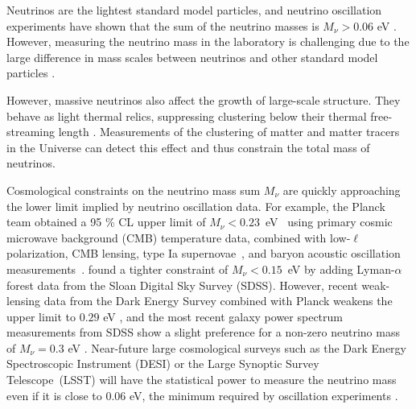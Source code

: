 \documentclass[useAMS, usenatbib]{mnras}
\begin{document}
Neutrinos are the lightest standard model particles, and neutrino oscillation experiments have shown that the sum of the neutrino masses is $M_\nu > 0.06$ eV \citep{Becker-Szendy_1992, Fukuda_1998}.
However, measuring the neutrino mass in the laboratory is challenging due to the large difference in mass scales between neutrinos and other standard model particles \cite[although see][]{Wolf_2010}.

However, massive neutrinos %
also affect the growth of large-scale structure. They behave as light thermal relics, suppressing clustering below their thermal
free-streaming length \citep[e.g.][]{Lesgourgues_2006, Wong_2011}.
Measurements of the clustering of matter and matter tracers in the Universe can detect this effect and thus constrain the total mass of neutrinos.

Cosmological constraints on the neutrino mass sum $M_\nu$ are quickly approaching the lower limit implied by neutrino oscillation data. For example, the Planck team obtained a 95 \% CL upper limit of $M_\nu<0.23$~eV~\citep{planck2015xiii} using primary cosmic microwave background (CMB) temperature data, combined with low-$\ell$ polarization, CMB lensing, type Ia supernovae~\citep{Betoule_2014}, and baryon acoustic oscillation
measurements~\citep{Beutler_2011, Anderson_2014, Ross_2015}. \cite{Palanque_2015} found a tighter constraint of $M_\nu<0.15$~eV by adding Lyman-$\alpha$ forest data from the Sloan Digital Sky Survey (SDSS). However, recent weak-lensing data from the Dark Energy Survey combined with Planck weakens the upper limit to $0.29$ eV \citep{DES_2017}, and the most recent galaxy power spectrum measurements from SDSS show a slight preference for a non-zero neutrino mass of $M_\nu = 0.3$ eV \citep{Beutler_2014}.
Near-future large cosmological surveys such as the Dark Energy Spectroscopic Instrument (DESI) \citep{DESI} or the
Large Synoptic Survey Telescope~(LSST) \citep{LSST, Joudaki_2012} will have the statistical power to measure the neutrino mass even if it is close to $0.06$ eV, the minimum required by oscillation experiments \citep{Abazajian_2015}.
\end{document}
